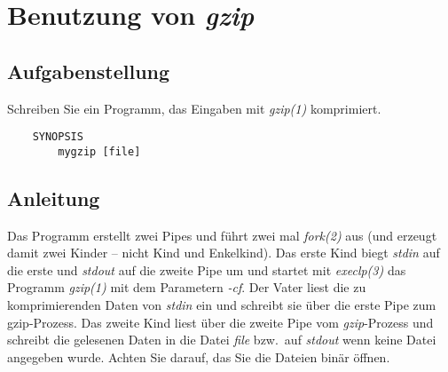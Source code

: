 




\section{Benutzung von \emph{gzip}}

\subsection{Aufgabenstellung}
Schreiben Sie ein Programm, das Eingaben mit \emph{gzip(1)} komprimiert.
\begin{verbatim}
    SYNOPSIS
        mygzip [file]
\end{verbatim}


\subsection{Anleitung}  
Das Programm erstellt zwei Pipes und führt zwei mal \emph{fork(2)} aus (und erzeugt damit zwei Kinder – nicht Kind und Enkelkind).
Das erste Kind biegt \emph{stdin} auf die erste und \emph{stdout} auf die zweite Pipe um und startet mit \emph{execlp(3)} das Programm \emph{gzip(1)} mit dem Parametern \emph{-cf}.
Der Vater liest die zu komprimierenden Daten von \emph{stdin} ein und schreibt sie über die erste Pipe zum gzip-Prozess.
Das zweite Kind liest über die zweite Pipe vom \emph{gzip}-Prozess und schreibt die gelesenen Daten in die Datei \emph{file} bzw.\ auf \emph{stdout} wenn keine Datei angegeben wurde.
Achten Sie darauf, das Sie die Dateien binär öffnen.

\osueguidelinestwo


